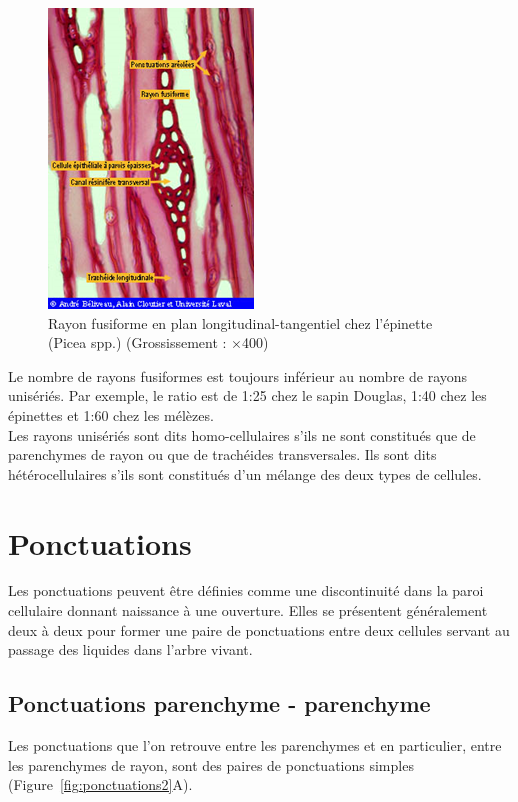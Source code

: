 \begin{figure}[h]
\centering
\includegraphics[scale=0.8]{img/ch3_fusiforme}
\caption{Rayon fusiforme en plan longitudinal-tangentiel chez l'épinette (Picea spp.) (Grossissement : $\times$400)}
\label{fig:fusiforme}
\end{figure}

Le nombre de rayons fusiformes est toujours inférieur au nombre de rayons unisériés. Par exemple, le ratio est de 1:25 chez le sapin Douglas, 1:40 chez les épinettes et 1:60 chez les mélèzes.\\

Les rayons unisériés sont dits homo-cellulaires s'ils ne sont constitués que de parenchymes de rayon ou que de trachéides transversales. Ils sont dits hétérocellulaires s'ils sont constitués d'un mélange des deux types de cellules.

\section{Ponctuations} %

Les ponctuations peuvent être définies comme une discontinuité dans la paroi cellulaire donnant naissance à une ouverture. Elles se présentent généralement deux à deux pour former une paire de ponctuations entre deux cellules servant au passage des liquides dans l'arbre vivant.
%
\subsection{Ponctuations parenchyme - parenchyme}

Les ponctuations que l'on retrouve entre les parenchymes et en particulier, entre les parenchymes de rayon, sont des paires de ponctuations simples (Figure~\ref{fig:ponctuations2}A).

